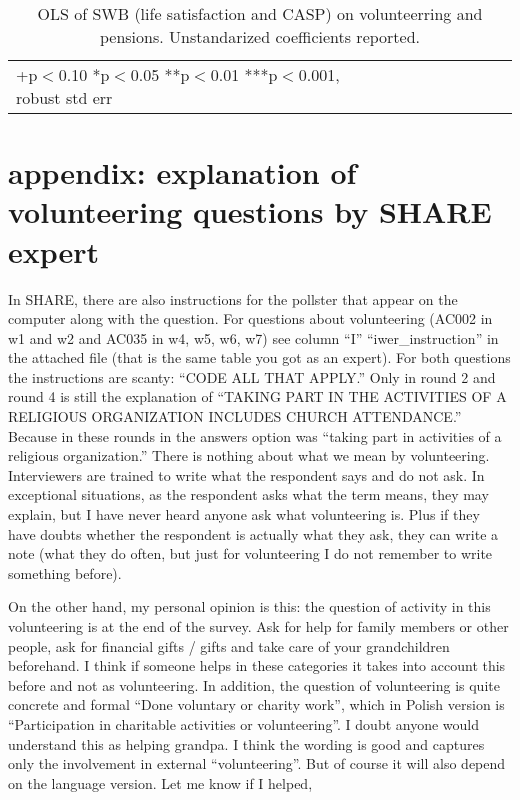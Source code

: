 \documentclass[10pt, letterpaper]{article}
\begin{document}
\begin{spacing}{1.4}
\begin{spacing}{.9}
\begin{spacing}{.9}
\begin{table}[H]\centering \caption{OLS of SWB  (life satisfaction and CASP) on
    volunteerring and pensions.  Unstandarized coefficients reported.}  \begin{scriptsize} \begin{tabular}{p{1.8in}p{.5in}p{.5in}p{.5in}p{.5in}|p{.5in}p{.5in}p{.5in}p{.5in}p{.5in}p{.4in}p{.5in}p{.4in}}\hline 
      \hline\multicolumn{5}{l}{+p$<$0.10 *p$<$0.05 **p$<$0.01 ***p$<$0.001,
        robust std err} \end{tabular}\label{regEw6w4} \end{scriptsize}\end{table}
\end{spacing}



\section{appendix: explanation of volunteering questions by SHARE expert}%

In SHARE, there are also instructions for the pollster that appear on the
computer along with the question. For questions about volunteering (AC002 in w1
and w2 and AC035 in w4, w5, w6, w7) see column ``I'' ``iwer\_instruction'' in the
attached file (that is the same table you got as an expert).
For both questions the instructions are scanty: ``CODE ALL THAT APPLY.'' Only in
round 2 and round 4 is still the explanation of ``TAKING PART IN THE ACTIVITIES
OF A RELIGIOUS ORGANIZATION INCLUDES CHURCH ATTENDANCE.'' Because in these
rounds in the answers option was ``taking part in activities of a religious
organization.'' There is nothing about what we mean by
volunteering. Interviewers are trained to write what the respondent says and do
not ask. In exceptional situations, as the respondent asks what the term means,
they may explain, but I have never heard anyone ask what volunteering is. Plus
if they have doubts whether the respondent is actually what they ask, they can
write a note (what they do often, but just for volunteering I do not remember to
write something before).

On the other hand, my personal opinion is this: the question of activity in this
volunteering is at the end of the survey. Ask for help for family members or
other people, ask for financial gifts / gifts and take care of your
grandchildren beforehand. I think if someone helps in these categories it takes
into account this before and not as volunteering.
In addition, the question of volunteering is quite concrete and formal ``Done
voluntary or charity work'', which in Polish version is ``Participation in
charitable activities or volunteering''. I doubt anyone would understand this as
helping grandpa. I think the wording is good and captures only the involvement
in external ``volunteering''. But of course it will also depend on the language
version.
Let me know if I helped,

\end{spacing}
\end{spacing}
\end{document}
